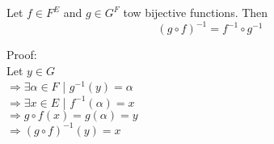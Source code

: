 \documentclass{article}
\begin{document}
\noindent Let $f \in F^E$ and $g \in G^F$ tow bijective functions. Then \\
\[
(g \circ f)^{-1} = f^{-1} \circ g^{-1}
\]

\noindent Proof:\\
Let $y \in G$\\
$\Rightarrow \exists \alpha  \in F $ | $ g^{-1}(y) = \alpha$\\
$\Rightarrow \exists x \in E $ | $ f^{-1}(\alpha) = x$\\
$\Rightarrow g \circ f(x) = g(\alpha) = y $\\
$\Rightarrow (g \circ f)^{-1}(y)  = x $\\
\end{document}
